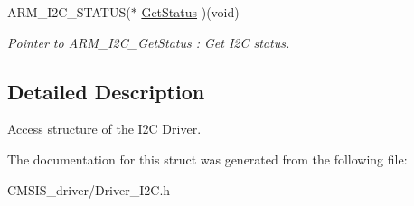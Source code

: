 \begin{DoxyCompactItemize}
\mbox{\label{struct___a_r_m___d_r_i_v_e_r___i2_c_a55ee1730ea2897c527b7202dd957e66f}} 
A\+R\+M\+\_\+\+I2\+C\+\_\+\+S\+T\+A\+T\+US($\ast$ \mbox{\hyperlink{struct___a_r_m___d_r_i_v_e_r___i2_c_a55ee1730ea2897c527b7202dd957e66f}{Get\+Status}} )(void)
\begin{DoxyCompactList}\small\item\em Pointer to A\+R\+M\+\_\+\+I2\+C\+\_\+\+Get\+Status \+: Get I2C status. \end{DoxyCompactList}\end{DoxyCompactItemize}


\subsection{Detailed Description}
Access structure of the I2C Driver. 

The documentation for this struct was generated from the following file\+:\begin{DoxyCompactItemize}
\item 
C\+M\+S\+I\+S\+\_\+driver/Driver\+\_\+\+I2\+C.\+h\end{DoxyCompactItemize}
